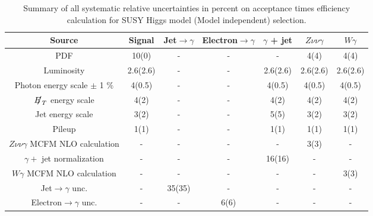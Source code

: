 \begin{table}[htbp]
\scriptsize
\centering
\begin{tabular}{|c|c|c|c|c|c|c|}
\hline
Source   & Signal & Jet$\rightarrow \gamma$ & Electron$\rightarrow \gamma$ & $\gamma$ + jet & $Z\nu\nu\gamma$ & $W\gamma$ \\
\hline
PDF & 10(0) & - & - & - & 4(4) & 4(4) \\
\hline
Luminosity & 2.6(2.6) & - & - & 2.6(2.6) & 2.6(2.6) & 2.6(2.6) \\
\hline
Photon energy scale $\pm$ 1 $\%$  & 4(0.5) & - & - & 4(0.5) & 4(0.5) & 4(0.5) \\
\hline
$\met$ energy scale & 4(2) & - & - & 4(2) & 4(2) & 4(2) \\
\hline
Jet energy scale & 3(2) & - & - & 5(5) & 3(2) & 3(2) \\
\hline
Pileup  &  1(1) & - & - & 1(1) & 1(1) & 1(1) \\
\hline
$Z\nu\nu\gamma$ MCFM NLO calculation & - & - & - & - & 3(3) & - \\
\hline
$\gamma +$ jet normalization  & - & - & - & 16(16) & - & - \\
\hline
$W\gamma$ MCFM NLO calculation & - & - & - & - & - & 3(3) \\
\hline
Jet$\rightarrow \gamma$ unc.   & - & 35(35) & - & - & - & - \\
\hline
Electron$\rightarrow \gamma$ unc.   & - & - & 6(6) & - & - & - \\
\hline
\end{tabular}
\caption{Summary of all systematic relative uncertainties in percent on acceptance times efficiency calculation for SUSY Higgs model (Model independent) selection. }
\label{tab:sys}
\end{table}

